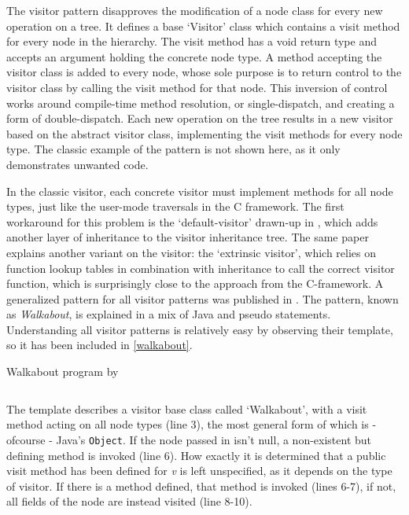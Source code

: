 \documentclass[twoside,openright]{uva-bachelor-thesis}
\newcommand{\code}[1]{\texttt{\footnotesize#1}}
\begin{document}
			The visitor pattern disapproves the modification of a node class for every new operation on a tree. It defines a base `Visitor' class which contains a visit method for every node in the hierarchy. The visit method has a void return type and accepts an argument holding the concrete node type. A method accepting the visitor class is added to every node, whose sole purpose is to return control to the visitor class by calling the visit method for that node. This inversion of control works around compile-time method resolution, or single-dispatch, and creating a form of double-dispatch. Each new operation on the tree results in a new visitor based on the abstract visitor class, implementing the visit methods for every node type. The classic example of the pattern is not shown here, as it only demonstrates unwanted code.
			
			In the classic visitor, each concrete visitor must implement methods for all node types, just like the user-mode traversals in the C framework. The first workaround for this problem is the `default-visitor' drawn-up in \citeyear{nordberg1996}, which adds another layer of inheritance to the visitor inheritance tree\cite{nordberg1996}. The same paper explains another variant on the visitor: the `extrinsic visitor', which relies on function lookup tables in combination with inheritance to call the correct visitor function, which is surprisingly close to the approach from the C-framework. A generalized pattern for all visitor patterns was published in \citeyear{palsberg1998essence}. The pattern, known as \emph{Walkabout}, is explained in a mix of Java and pseudo statements. Understanding all visitor patterns is relatively easy by observing their template, so it has been included in \cref{walkabout}\cite{palsberg1998essence}.
			
			\begin{codebox}[label=walkabout]{Walkabout program by \citeauthor{palsberg1998essence}}
				\inputminted[frame=leftline,linenos]{java}{samples/walkabout.java}
			\end{codebox}
			
			The template describes a visitor base class called `Walkabout', with a visit method acting on all node types (line 3), the most general form of which is - ofcourse - Java's \code{Object}. If the node passed in isn't null, a non-existent but defining method is invoked (line 6). How exactly it is determined that a public visit method has been defined for \emph{v} is left unspecified, as it depends on the type of visitor. If there is a method defined, that method is invoked (lines 6-7), if not, all fields of the node are instead visited (line 8-10).
			
\end{document}

